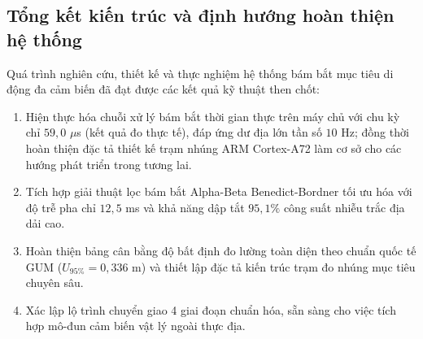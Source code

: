 \subsection{Tổng kết kiến trúc và định hướng hoàn thiện hệ thống}

\hspace{0.5cm} Quá trình nghiên cứu, thiết kế và thực nghiệm hệ thống bám bắt mục tiêu di động đa cảm biến đã đạt được các kết quả kỹ thuật then chốt:
\begin{enumerate}
    \item Hiện thực hóa chuỗi xử lý bám bắt thời gian thực trên máy chủ với chu kỳ chỉ $59{,}0$ $\mu$s (kết quả đo thực tế), đáp ứng dư địa lớn tần số $10$ Hz; đồng thời hoàn thiện đặc tả thiết kế trạm nhúng ARM Cortex-A72 làm cơ sở cho các hướng phát triển trong tương lai.
    \item Tích hợp giải thuật lọc bám bắt Alpha-Beta Benedict-Bordner tối ưu hóa với độ trễ pha chỉ $12{,}5$ ms và khả năng dập tắt $95{,}1\%$ công suất nhiễu trắc địa dải cao.
    \item Hoàn thiện bảng cân bằng độ bất định đo lường toàn diện theo chuẩn quốc tế GUM ($U_{95\%} = 0{,}336$ m) và thiết lập đặc tả kiến trúc trạm đo nhúng mục tiêu chuyên sâu.
    \item Xác lập lộ trình chuyển giao 4 giai đoạn chuẩn hóa, sẵn sàng cho việc tích hợp mô-đun cảm biến vật lý ngoài thực địa.
\end{enumerate}
